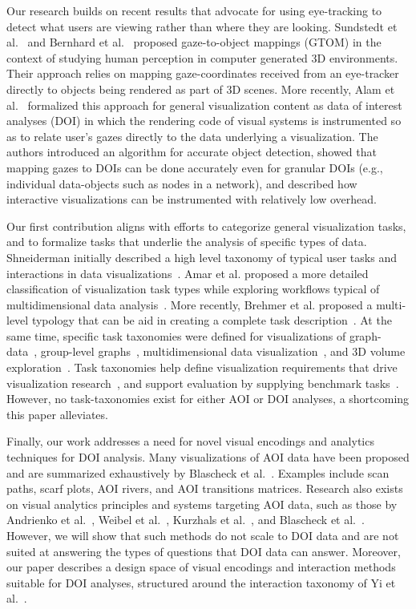 Our research builds on recent results that advocate for using eye-tracking to detect what users are viewing rather than where they are looking. Sundstedt et al.~\cite{sundstedt2013visual} and Bernhard et al.~\cite{bernhard2014gaze} proposed gaze-to-object mappings (GTOM) in the context of studying human perception in computer generated 3D environments. Their approach relies on mapping gaze-coordinates received from an eye-tracker directly to objects being rendered as part of 3D scenes. More recently, Alam et al.~\cite{alam15analyzing} formalized this approach for general visualization content as data of interest analyses (DOI) in which the rendering code of visual systems is instrumented so as to relate user's gazes directly to the data underlying a visualization. The authors introduced an algorithm for accurate object detection, showed that mapping gazes to DOIs can be done accurately even for granular DOIs (e.g., individual data-objects such as nodes in a network), and described how interactive visualizations can be instrumented with relatively low overhead.

Our first contribution aligns with efforts to categorize general visualization tasks, and to formalize tasks that underlie the analysis of specific types of data. Shneiderman initially described a high level taxonomy of typical user tasks and interactions in data visualizations~\cite{shneiderman1996eyes}. Amar et al. proposed a more detailed classification of visualization task types while exploring workflows typical of multidimensional data analysis~\cite{amar2005low}.  More recently, Brehmer et al. proposed a multi-level typology that can be aid in creating a complete task description~\cite{brehmer2013multi}. At the same time, specific task taxonomies were defined for visualizations of graph-data~\cite{lee2006task}, group-level graphs~\cite{saket2014group}, multidimensional data  visualization~\cite{ward2002taxonomy}, and 3D volume exploration~\cite{lahaclassification}. Task taxonomies help define visualization requirements that drive visualization research~\cite{amar2005low},  and support evaluation by supplying benchmark tasks~\cite{okoe2015graphunit,jianu2014display,saket2014group,ghoniem2004comparison}. However, no task-taxonomies exist for either AOI or DOI analyses, a shortcoming this paper alleviates.   
 
Finally, our work addresses a need for novel visual encodings and analytics techniques for DOI analysis. Many visualizations of AOI data have been proposed and are summarized exhaustively by Blascheck et al.~\cite{blascheck2014state}.  Examples include scan paths, scarf plots, AOI rivers, and AOI transitions matrices. Research also exists on visual analytics principles and systems targeting AOI data, such as those by Andrienko et al.~\cite{andrienko2012visual}, Weibel et al.~\cite{weibel2012let}, Kurzhals et al.~\cite{kurzhals2014iseecube}, and Blascheck et al.~\cite{blascheck2014state}. However, we will show that such methods do not scale to DOI data and are not suited at answering the types of questions that DOI data can answer. Moreover, our paper describes a design space of visual encodings and interaction methods suitable for DOI analyses, structured around the interaction taxonomy of Yi et al.~\cite{yi2007toward}.


